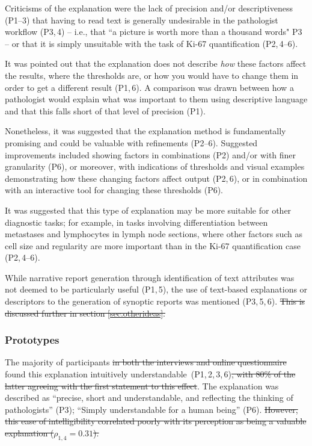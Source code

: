 \documentclass[final,5p,times,twocolumn,hyphens]{elsarticle} %
\providecommand{\DIFdeltex}[1]{{\protect\color{red}\sout{#1}}}                      %
\providecommand{\DIFaddbegin}{} %
\providecommand{\DIFdelbegin}{} %
\providecommand{\DIFdelend}{} %
\providecommand{\DIFdel}[1]{\texorpdfstring{\DIFdeltex{#1}}{}} %
\newcommand{\DIFscaledelfig}{0.5}
\newlength{\DIFdelgraphicswidth} %
\newlength{\DIFdelgraphicsheight} %
\newcommand{\DIFaddincludegraphics}[2][]{{\color{blue}\fbox{\DIFOincludegraphics[#1]{#2}}}} %
\newcommand{\DIFdelincludegraphics}[2][]{%
\sbox{\DIFdelgraphicsbox}{\DIFOincludegraphics[#1]{#2}}%
\settoboxwidth{\DIFdelgraphicswidth}{\DIFdelgraphicsbox} %
\settoboxtotalheight{\DIFdelgraphicsheight}{\DIFdelgraphicsbox} %
\scalebox{\DIFscaledelfig}{%
\parbox[b]{\DIFdelgraphicswidth}{\usebox{\DIFdelgraphicsbox}\\[-\baselineskip] \rule{\DIFdelgraphicswidth}{0em}}\llap{\resizebox{\DIFdelgraphicswidth}{\DIFdelgraphicsheight}{%
\setlength{\unitlength}{\DIFdelgraphicswidth}%
\begin{picture}(1,1)%
\thicklines\linethickness{2pt} %
{\color[rgb]{1,0,0}\put(0,0){\framebox(1,1){}}}%
{\color[rgb]{1,0,0}\put(0,0){\line( 1,1){1}}}%
{\color[rgb]{1,0,0}\put(0,1){\line(1,-1){1}}}%
\end{picture}%
}\hspace*{3pt}}} %
} %
\DeclareRobustCommand{\DIFaddbegin}{\DIFOaddbegin \let\includegraphics\DIFaddincludegraphics} %
\DeclareRobustCommand{\DIFdelbegin}{\DIFOdelbegin \let\includegraphics\DIFdelincludegraphics} %
\DeclareRobustCommand{\DIFdelend}{\DIFOaddend \let\includegraphics\DIFOincludegraphics} %
\begin{document}
Criticisms of the explanation were the lack of precision and/or descriptiveness (P1--3) that having to read text is generally undesirable in the pathologist workflow (P3,\,4) -- i.e., that ``a picture is worth more than a thousand words" P3 -- or that it is simply unsuitable with the task of Ki-67 quantification (P2,\,4--6). 

It was pointed out that the explanation does not describe \textit{how} these factors affect the results, where the thresholds are, or how you would have to change them in order to get a different result (P1,\,6). A comparison was drawn between how a pathologist would explain what was important to them using descriptive language and that this falls short of that level of precision (P1).

Nonetheless, it was suggested that the explanation method is fundamentally promising and could be valuable with refinements (P2--6). Suggested improvements included showing factors in combinations (P2) and/or with finer granularity (P6), or moreover, with indications of thresholds and visual examples demonstrating how these changing factors affect output (P2,\,6), or in combination with an interactive tool for changing these thresholds (P6). 

It was suggested that this type of explanation may be more suitable for other diagnostic tasks; for example, in tasks involving differentiation between metastases and lymphocytes in lymph node sections, where other factors such as cell size and regularity are more important than in the Ki-67 quantification case (P2,\,4--6).

While narrative report generation through identification of text attributes was not deemed to be particularly useful (P1,\,5), the use of text-based explanations or descriptors to the generation of synoptic reports was mentioned (P3,\,5,\,6). 
\DIFdelbegin \DIFdel{This is discussed further in section \ref{sec:otherideas}.
}\DIFdelend %

\subsubsection{Prototypes}

The majority of participants \DIFdelbegin \DIFdel{in both the interviews and online questionnaire }\DIFdelend found this explanation intuitively understandable~(P1,\,2,\,3,\,6)\DIFdelbegin \DIFdel{, with 80\% of the latter agreeing with the first statement to this effect}\DIFdelend . The explanation was described as “precise, short and understandable, and reflecting the thinking of pathologists” (P3); “Simply understandable for a human being” (P6).
\DIFdelbegin \DIFdel{However, this ease of intelligibility correlated poorly with its perception as being a valuable explanation (\(\rho_{1,4} = 0.31\)). 
}\DIFdelend \DIFaddbegin 
\end{document}

